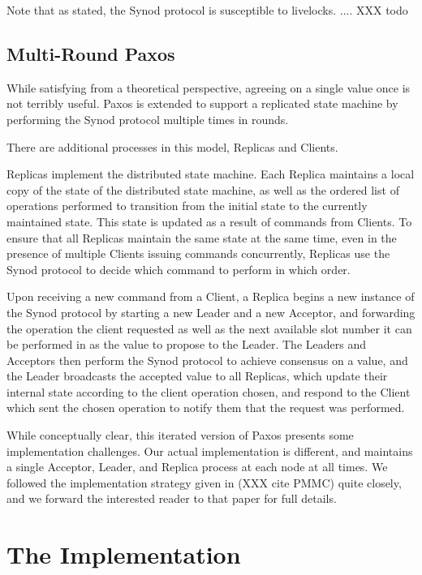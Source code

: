 \documentclass{sig-alternate}
\begin{document}
Note that as stated, the Synod protocol is susceptible to livelocks.  .... XXX todo

\subsection{Multi-Round Paxos}

While satisfying from a theoretical perspective, agreeing on a single value once is not terribly useful. Paxos is extended to support a replicated state machine by performing the Synod protocol multiple times in rounds.

There are additional processes in this model, Replicas and Clients.

Replicas implement the distributed state machine. Each Replica maintains a local copy of the state of the distributed state machine, as well as the ordered list of operations performed to transition from the initial state to the currently maintained state. This state is updated as a result of commands from Clients. To ensure that all Replicas maintain the same state at the same time, even in the presence of multiple Clients issuing commands concurrently, Replicas use the Synod protocol to decide which command to perform in which order.

Upon receiving a new command from a Client, a Replica begins a new instance of the Synod protocol by starting a new Leader and a new Acceptor, and forwarding the operation the client requested as well as the next available slot number it can be performed in as the value to propose to the Leader. The Leaders and Acceptors then perform the Synod protocol to achieve consensus on a value, and the Leader broadcasts the accepted value to all Replicas, which update their internal state according to the client operation chosen, and respond to the Client which sent the chosen operation to notify them that the request was performed.

While conceptually clear, this iterated version of Paxos presents some implementation challenges. Our actual implementation is different, and maintains a single Acceptor, Leader, and Replica process at each node at all times. We followed the implementation strategy given in (XXX cite PMMC) quite closely, and we forward the interested reader to that paper for full details.


\section{The Implementation}
\end{document}
